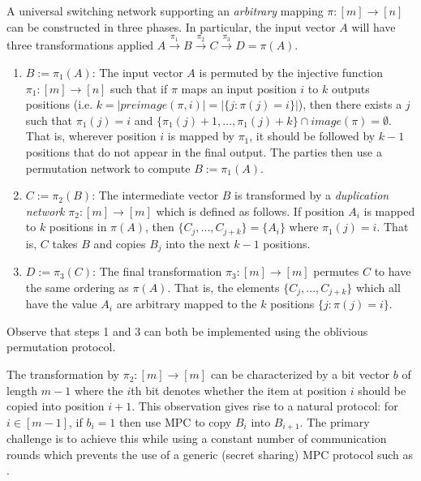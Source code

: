 A universal switching network supporting an \emph{arbitrary} mapping $\pi : [m]\rightarrow [n]$ can be constructed in three phases\cite{MS13}. In particular, the input vector $A$ will have three transformations applied $A\overset{\pi_1}{\rightarrow}B\overset{\pi_2}{\rightarrow}C\overset{\pi_3}{\rightarrow}D=\pi(A)$.
\begin{enumerate}
	\item $B:=\pi_1(A)$:  The input vector $A$ is permuted by the injective function $\pi_1:[m]\rightarrow[n]$ such that if $\pi$ maps an input position $i$ to $k$ outputs positions (i.e. $k=|preimage(\pi,i)|=|\{ j : \pi(j)=i \}|$), then there exists a $j$ such that $\pi_1(j)=i$  and $\{\pi_1(j)+ 1,...,\pi_1(j )+k \} \cap image(\pi) = \emptyset$. That is, wherever position $i$ is mapped by $\pi_1$, it should be followed by $k-1$ positions that do not appear in the final output. The parties then use a permutation network to compute $B:=\pi_1(A)$.
	
	\item $C:=\pi_2(B)$: The intermediate vector $B$ is transformed by a \emph{duplication network}  $\pi_2:[m]\rightarrow[m]$ which is defined as follows. If position $A_i$ is mapped to $k$ positions in $\pi(A)$, then $\{ C_{j},...,C_{j+k}\} = \{A_i\}$ where $\pi_1(j)=i$. That is, $C$ takes $B$ and copies $B_{j}$ into the next $k-1$ positions. 
	
	\item $D:=\pi_3(C)$: The final transformation $\pi_3:[m]\rightarrow[m]$  permutes $C$ to have the same ordering as $\pi(A)$. That is, the elements $\{ C_{j},...,C_{j+k}\}$ which all have the value  $A_i$ are arbitrary mapped to the $k$ positions $\{ j : \pi(j)=i \}$.
\end{enumerate}
Observe that steps 1 and 3 can both be implemented using the oblivious permutation protocol.%

The transformation by $\pi_2:[m]\rightarrow[m]$ can be characterized by a bit vector $b$ of length $m-1$ where the $i$th bit denotes whether the item at position $i$ should be copied into position $i+1$. This observation gives rise to a natural protocol: for $i\in [m-1]$, if $b_i=1$ then use MPC to copy $B_i$ into $B_{i+1}$. The primary challenge is to achieve this while using a constant number of communication rounds which prevents the use of a generic (secret sharing) MPC protocol such as \cite{aby3, highthroughput}.

